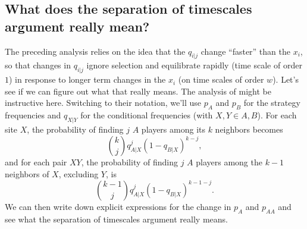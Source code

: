 \documentclass[14pt, a4paper, justified]{article}
\begin{document}
\subsection{What does the separation of timescales argument really mean?}

The preceding analysis relies on the idea that the $q_{i|j}$ change ``faster'' than the $x_i$, so that changes in $q_{i|j}$ ignore selection and equilibrate rapidly (time scale of order $1$) in response to longer term changes in the $x_i$ (on time scales of order $w$).
Let's see if we can figure out what that really means.
The analysis of \citet{pena.etal_2016} might be instructive here.
Switching to their notation, we'll use $p_A$ and $p_B$ for the strategy frequencies and $q_{X|Y}$ for the conditional frequencies (with $X, Y \in A, B$).
For each site $X$, the probability of finding $j$ $A$ players among its $k$ neighbors becomes
\begin{equation}
    {k \choose j} q_{A|X}^j (1 - q_{B|X})^{k-j},
\end{equation}
and for each pair $XY$, the probability of finding $j$ $A$ players among the $k-1$ neighbors of $X$, excluding $Y$, is
\begin{equation}
    {k-1 \choose j} q_{A|X}^j (1 - q_{B|X})^{k-1-j}.
\end{equation}
We can then write down explicit expressions for the change in $p_A$ and $p_{AA}$ and see what the separation of timescales argument really means.
\end{document}
